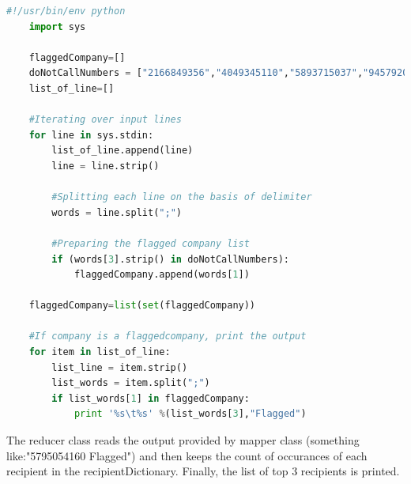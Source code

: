 \documentclass[a4paper, 10pt]{article}
\begin{document}
\begin{lstlisting}[language=Python, caption=Mapper for problem 3]
    #!/usr/bin/env python
    import sys
    
    flaggedCompany=[]
    doNotCallNumbers = ["2166849356","4049345110","5893715037","9457920329"]
    list_of_line=[]

    #Iterating over input lines
    for line in sys.stdin:
        list_of_line.append(line)
        line = line.strip()

        #Splitting each line on the basis of delimiter
        words = line.split(";")

        #Preparing the flagged company list
        if (words[3].strip() in doNotCallNumbers):
            flaggedCompany.append(words[1]) 
        
    flaggedCompany=list(set(flaggedCompany))   
    
    #If company is a flaggedcompany, print the output
    for item in list_of_line:
        list_line = item.strip()
        list_words = item.split(";")
        if list_words[1] in flaggedCompany:
            print '%s\t%s' %(list_words[3],"Flagged")         
\end{lstlisting}

The reducer class reads the output provided by mapper class (something like:"5795054160 Flagged") and then keeps the count of occurances of each recipient in the recipientDictionary. Finally, the list of top 3 recipients is printed.
\end{document}
